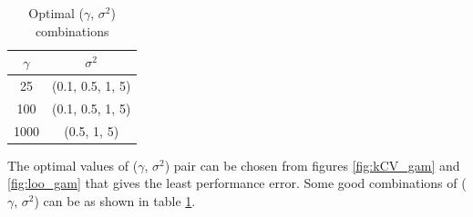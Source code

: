 {\begin{table}
	\caption{Optimal ($\gamma$, $\sigma^2$) combinations}\label{table:4}
	\begin{tabular}{|c|c|}
		\hline
		$\gamma$ & $\sigma^2$ \\ \hline
		25 & (0.1, 0.5, 1, 5) \\ \hline
		100 & (0.1, 0.5, 1, 5)  \\ \hline
		1000 & (0.5, 1, 5)  \\ \hline
	\end{tabular}
\end{table}
 The optimal values of ($\gamma$, $\sigma^2$) pair can be chosen from figures \ref{fig:kCV_gam} and \ref{fig:loo_gam} that gives the least performance error. Some good combinations of ($\gamma$, $\sigma^2$) can be as shown in table \ref{table:4}.\\
 \begin{figure}[!htbp]
	\begin{floatrow}
\end{floatrow}
\end{figure}}
